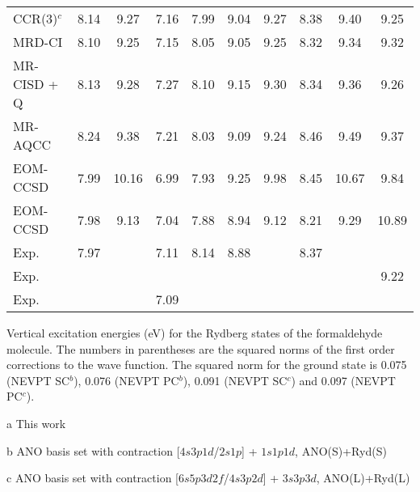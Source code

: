 \begin{center}
\begin{threeparttable}
\begin{tabular}{lccccccccc}
CCR(3)$^c$ \cite{mp-101-483-2003}
               &    8.14 & 9.27  & 7.16  & 7.99  & 9.04  & 9.27  & 8.38  & 9.40  & 9.25 \\
MRD-CI \cite{jpc-99-8050-1995}
                &   8.10 & 9.25  & 7.15  & 8.05  & 9.05  & 9.25  & 8.32  & 9.34  & 9.32 \\
MR-CISD + Q \cite{tca-106-369-2001}
                &   8.13 & 9.28  & 7.27  & 8.10  & 9.15  & 9.30  & 8.34  & 9.36  & 9.26 \\
MR-AQCC  \cite{tca-106-369-2001}
                &   8.24 & 9.38  & 7.21  & 8.03  & 9.09  & 9.24  & 8.46  & 9.49  & 9.37 \\
EOM-CCSD \cite{cpl-241-26-1995}
                &   7.99 &10.16  & 6.99  & 7.93  & 9.25  & 9.98  & 8.45  &10.67  & 9.84 \\
EOM-CCSD \cite{jpca-106-4192-2002}
                &   7.98 & 9.13  & 7.04  & 7.88  & 8.94  & 9.12  & 8.21  & 9.29  &10.89 \\
Exp. \cite{robin-hespm}
                &   7.97 &       & 7.11  & 8.14  & 8.88  &       & 8.37  &       &      \\
Exp. \cite{cp-70-291-1982}
                &        &       &       &       &       &       &       &       & 9.22 \\
Exp. \cite{jcsft-281-1643-1985,jcp-85-4228-1986}
                &        &       & 7.09  &       &       &       &       &       &      \\
\hline
\end{tabular}
\caption{\footnotesize Vertical excitation energies (eV) for the Rydberg states of
the formaldehyde molecule.  The numbers in parentheses are the squared norms
of the first order corrections to the wave function. The squared norm for
the ground state is 0.075 (NEVPT SC$^b$), 0.076 (NEVPT PC$^b$), 0.091
(NEVPT SC$^c$) and 0.097 (NEVPT PC$^c$).}
\label{tbl:form_exc_ryd}
\begin{tablenotes}
\footnotesize
\item[a] This work
\item[b] ANO basis set with contraction [$4s3p1d$/$2s1p$] + $1s1p1d$, ANO(S)+Ryd(S)
\item[c] ANO basis set with contraction [$6s5p3d2f$/$4s3p2d$] + $3s3p3d$, ANO(L)+Ryd(L)
\end{tablenotes}
\end{threeparttable}
\end{center}
